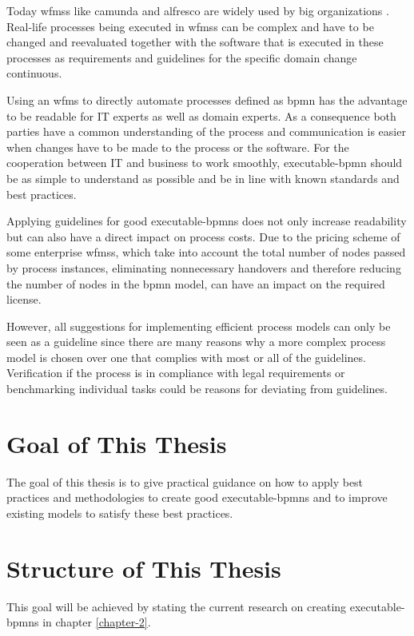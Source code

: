 \label{intro}Today \gls{wfms}s like \gls{camunda}  and \gls{alfresco} are widely used by big organizations \cite{camunda-customers} \cite{activity-customers}. Real-life processes being executed in \gls{wfms}s can be complex and have to be changed and reevaluated together with the software that is executed in these processes as requirements and guidelines for the specific domain change continuous. 

Using an \gls{wfms} to directly automate processes defined as \gls{bpmn} has the advantage to be readable for IT experts as well as domain experts. As a consequence both parties have a common understanding of the process and communication is easier when changes have to be made to the process or the software. For the cooperation between IT and business to work smoothly, \gls{executable-bpmn} should be as simple to understand as possible and be in line with known standards and best practices. 

Applying guidelines for good \gls{executable-bpmn}s does not only increase readability but can also have a direct impact on process costs. Due to the pricing scheme of some enterprise \gls{wfms}s, which take into account the total number of nodes passed by process instances, eliminating nonnecessary handovers and therefore reducing the number of nodes in the \gls{bpmn} model, can have an impact on the required license. 

However, all suggestions for implementing efficient process models can only be seen as a guideline since there are many reasons why a more complex process model is chosen over one that complies with most or all of the guidelines. Verification if the process is in compliance with legal requirements or benchmarking individual tasks could be reasons for deviating from guidelines.

\section{Goal of This Thesis}
The goal of this thesis is to give practical guidance on how to apply best practices and methodologies to create good \gls{executable-bpmn}s and to improve existing models to satisfy these best practices. 


\section{Structure of This Thesis}
This goal will be achieved by stating the current research on creating \gls{executable-bpmn}s in chapter \ref{chapter-2}. 

